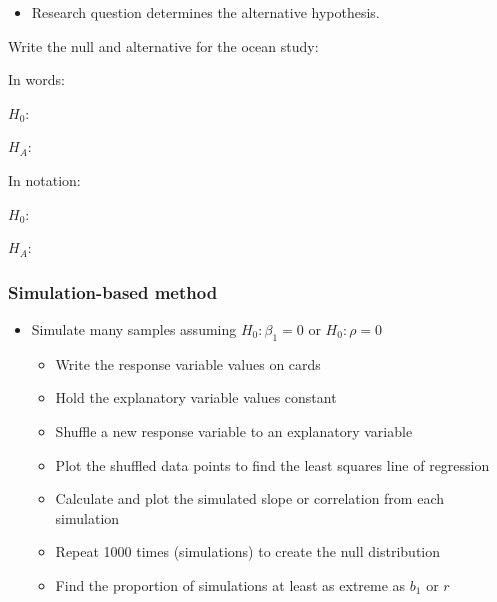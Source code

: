 \documentclass[
]{report}
\providecommand{\tightlist}{%
  \setlength{\itemsep}{0pt}\setlength{\parskip}{0pt}}
\begin{document}
\begin{itemize}
\tightlist
\item
  Research question determines the alternative hypothesis.
\end{itemize}

Write the null and alternative for the ocean study:

In words:

\(H_0:\)

\vspace{0.5in}

\(H_A:\)

\vspace{0.5in}

In notation:

\(H_0:\)

\vspace{0.2in}

\(H_A:\)

\vspace{0.2in}

\hypertarget{simulation-based-method-8}{%
\subsubsection*{Simulation-based method}\label{simulation-based-method-8}}

\begin{itemize}
\item
  Simulate many samples assuming \(H_0: \beta_1 = 0\) or \(H_0: \rho =0\)

  \begin{itemize}
  \item
    Write the response variable values on cards
  \item
    Hold the explanatory variable values constant
  \item
    Shuffle a new response variable to an explanatory variable
  \item
    Plot the shuffled data points to find the least squares line of regression
  \item
    Calculate and plot the simulated slope or correlation from each simulation
  \item
    Repeat 1000 times (simulations) to create the null distribution
  \item
    Find the proportion of simulations at least as extreme as \(b_1\) or \(r\)
  \end{itemize}
\end{itemize}
\end{document}
